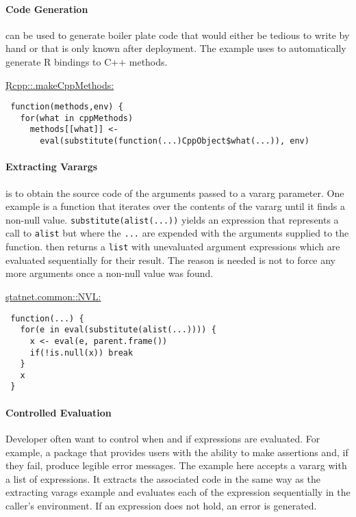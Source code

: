 \documentclass[screen,acmsmall]{acmart}%
\renewcommand{\k}[1]{\lstinline |#1|\xspace}
\begin{document}
\paragraph{Code Generation}
\Eval can be used to generate boiler plate code that would either be tedious to
write by hand or that is only known after deployment. The example uses \eval to
automatically generate R bindings to C++ methods.

\begin{minipage}{.95\textwidth}
\medskip\underline{\c{Rcpp::.makeCppMethods}:}
\begin{lstlisting}
 function(methods,env) {
   for(what in cppMethods)
     methods[[what]] <-
       eval(substitute(function(...)CppObject$what(...)), env)
\end{lstlisting}\medskip
\end{minipage}

\paragraph{Extracting Varargs}
\Eval is to obtain the source code of the arguments passed to a vararg
parameter. One example is a function that iterates over the contents of the
vararg until it finds a non-null value. \k{substitute(alist(...))} yields an
expression that represents a call to \k{alist} but where the \k{...} are
expended with the arguments supplied to the function. \Eval then returns a
\k{list} with unevaluated argument expressions which are evaluated sequentially
for their result. The reason \eval is needed is not to force
any more arguments once a non-null value was found. 

\begin{minipage}{.95\textwidth}
\medskip\underline{\c{statnet.common::NVL}:}
\begin{lstlisting}
 function(...) {
   for(e in eval(substitute(alist(...)))) {
     x <- eval(e, parent.frame())
     if(!is.null(x)) break
   }
   x
 }
\end{lstlisting}\medskip
\end{minipage}


\paragraph{Controlled Evaluation}
Developer often want to control when and if expressions are evaluated. For
example, a package that provides users with the ability to make assertions and,
if they fail, produce legible error messages. The example here accepts a vararg
with a list of expressions. It extracts the associated code in the same way as
the extracting varags example and evaluates each of the expression sequentially
in the caller's environment. If an expression does not hold, an error is
generated.
\end{document}
